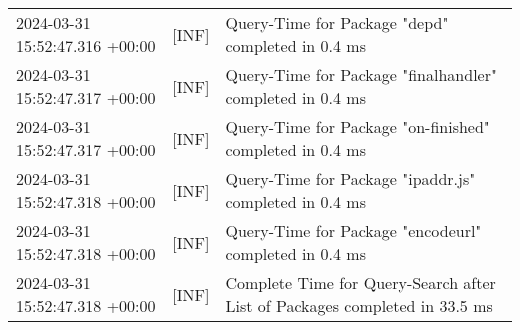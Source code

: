 {{\begin{tabularx}{\textwidth}{|l|l|X|}
                    2024-03-31 15:52:47.316 +00:00 & [INF] & Query-Time for Package "depd" completed in 0.4 ms \\
                    2024-03-31 15:52:47.317 +00:00 & [INF] & Query-Time for Package "finalhandler" completed in 0.4 ms \\
                    2024-03-31 15:52:47.317 +00:00 & [INF] & Query-Time for Package "on-finished" completed in 0.4 ms \\
                    2024-03-31 15:52:47.318 +00:00 & [INF] & Query-Time for Package "ipaddr.js" completed in 0.4 ms \\
                    2024-03-31 15:52:47.318 +00:00 & [INF] & Query-Time for Package "encodeurl" completed in 0.4 ms \\
                    2024-03-31 15:52:47.318 +00:00 & [INF] & Complete Time for Query-Search after List of Packages completed in 33.5 ms \\
                    \hline
                \end{tabularx}
            }
        }

